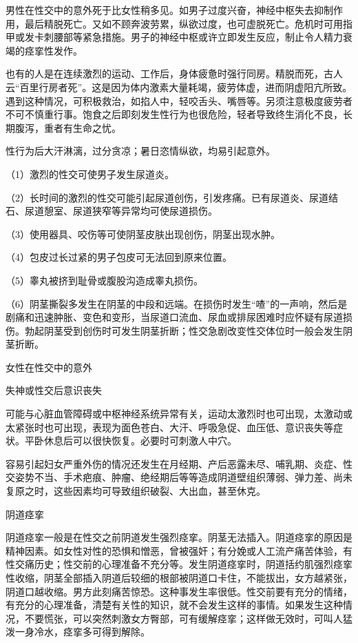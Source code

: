 \documentclass[12pt,UTF8,openany]{ctexbook}
\begin{document}
男性在性交中的意外死于比女性稍多见。如男子过度兴奋，神经中枢失去抑制作用，最后精脱死亡。又如不顾奔波劳累，纵欲过度，也可虚脱死亡。危机时可用指甲或发卡刺腰部等紧急措施。男子的神经中枢或许立即发生反应，制止令人精力衰竭的痉挛性发作。

也有的人是在连续激烈的运动、工作后，身体疲惫时强行同房。精脱而死，古人云“百里行房者死”。这是因为体内激素大量耗竭，疲劳体虚，进而阴虚阳亢所致。遇到这种情况，可积极救治，如掐人中，轻咬舌头、嘴唇等。另须注意极度疲劳者不可不慎重行事。饱食之后即刻发生性行为也很危险，轻者导致终生消化不良，长期腹泻，重者有生命之忧。

性行为后大汗淋漓，过分贪凉；暑日恣情纵欲，均易引起意外。

（1）激烈的性交可使男子发生尿道炎。

（2）长时间的激烈的性交可能引起尿道创伤，引发疼痛。已有尿道炎、尿道结石、尿道憩室、尿道狭窄等异常均可使尿道损伤。

（3）使用器具、咬伤等可使阴茎皮肤出现创伤，阴茎出现水肿。

（4）包皮过长过紧的男子包皮可无法回到原来位置。

（5）睾丸被挤到耻骨或腹股沟造成睾丸损伤。

（6）阴茎撕裂多发生在阴茎的中段和远端。在损伤时发生“喳”的一声响，然后是剧痛和迅速肿胀、变色和变形，当尿道口流血、尿血或排尿困难时应怀疑有尿道损伤。勃起阴茎受到创伤时可发生阴茎折断；性交急剧改变性交体位时一般会发生阴茎折断。





女性在性交中的意外


失神或性交后意识丧失

可能与心脏血管障碍或中枢神经系统异常有关，运动太激烈时也可出现，太激动或太紧张时也可出现，表现为面色苍白、大汗、呼吸急促、血压低、意识丧失等症状。平卧休息后可以很快恢复。必要时可刺激人中穴。

容易引起妇女严重外伤的情况还发生在月经期、产后恶露未尽、哺乳期、炎症、性交姿势不当、手术疤痕、肿瘤、绝经期后等等造成阴道壁组织薄弱、弹力差、尚未复原之时，这些因素均可导致组织破裂、大出血，甚至休克。

阴道痉挛

阴道痉挛一般是在性交之前阴道发生强烈痉挛。阴茎无法插入。阴道痉挛的原因是精神因素。如女性对性的恐惧和憎恶，曾被强奸；有分娩或人工流产痛苦体验，有性交痛历史；性交前的心理准备不充分等。发生阴道痉挛时，阴道括约肌强烈痉挛性收缩，阴茎全部插入阴道后较细的根部被阴道口卡住，不能拔出，女方越紧张，阴道口越收缩。男方此刻痛苦惊恐。这种事发生率很低。性交前要有充分的情绪，有充分的心理准备，清楚有关性的知识，就不会发生这样的事情。如果发生这种情况，不要慌张，可以突然刺激女方臀部，可有缓解痉挛；这样做无效时，可叫人猛泼一身冷水，痉挛多可得到解除。
\end{document}
